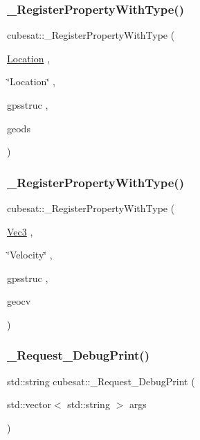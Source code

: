 \subsubsection{\texorpdfstring{\+\_\+\+Register\+Property\+With\+Type()}{\_RegisterPropertyWithType()}\hspace{0.1cm}{\footnotesize\ttfamily [4/5]}}
{\footnotesize\ttfamily cubesat\+::\+\_\+\+Register\+Property\+With\+Type (\begin{DoxyParamCaption}\item[{\hyperlink{structcubesat_1_1Location}{Location}}]{,  }\item[{\char`\"{}Location\char`\"{}}]{,  }\item[{gpsstruc}]{,  }\item[{geods}]{ }\end{DoxyParamCaption})}

\mbox{\label{namespacecubesat_a71c1f96727249243c284337421b58dac}} 
\subsubsection{\texorpdfstring{\+\_\+\+Register\+Property\+With\+Type()}{\_RegisterPropertyWithType()}\hspace{0.1cm}{\footnotesize\ttfamily [5/5]}}
{\footnotesize\ttfamily cubesat\+::\+\_\+\+Register\+Property\+With\+Type (\begin{DoxyParamCaption}\item[{\hyperlink{structcubesat_1_1Vec3}{Vec3}}]{,  }\item[{\char`\"{}Velocity\char`\"{}}]{,  }\item[{gpsstruc}]{,  }\item[{geocv}]{ }\end{DoxyParamCaption})}

\mbox{\label{namespacecubesat_a03e9fbf30b91d3d0992e8a539cbb855a}} 
\subsubsection{\texorpdfstring{\+\_\+\+Request\+\_\+\+Debug\+Print()}{\_Request\_DebugPrint()}}
{\footnotesize\ttfamily std\+::string cubesat\+::\+\_\+\+Request\+\_\+\+Debug\+Print (\begin{DoxyParamCaption}\item[{std\+::vector$<$ std\+::string $>$}]{args }\end{DoxyParamCaption})}



